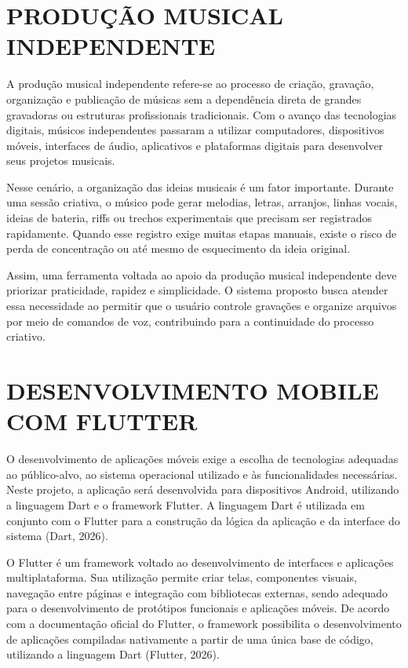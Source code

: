 \documentclass[12pt,oneside,a4paper,brazil,final]{abntex2}
\begin{document}
\section{PRODUÇÃO MUSICAL INDEPENDENTE}



A produção musical independente refere-se ao processo de criação, gravação, organização e publicação de músicas sem a dependência direta de grandes gravadoras ou estruturas profissionais tradicionais. Com o avanço das tecnologias digitais, músicos independentes passaram a utilizar computadores, dispositivos móveis, interfaces de áudio, aplicativos e plataformas digitais para desenvolver seus projetos musicais.



Nesse cenário, a organização das ideias musicais é um fator importante. Durante uma sessão criativa, o músico pode gerar melodias, letras, arranjos, linhas vocais, ideias de bateria, riffs ou trechos experimentais que precisam ser registrados rapidamente. Quando esse registro exige muitas etapas manuais, existe o risco de perda de concentração ou até mesmo de esquecimento da ideia original.



Assim, uma ferramenta voltada ao apoio da produção musical independente deve priorizar praticidade, rapidez e simplicidade. O sistema proposto busca atender essa necessidade ao permitir que o usuário controle gravações e organize arquivos por meio de comandos de voz, contribuindo para a continuidade do processo criativo.



\section{DESENVOLVIMENTO MOBILE COM FLUTTER}



O desenvolvimento de aplicações móveis exige a escolha de tecnologias adequadas ao público-alvo, ao sistema operacional utilizado e às funcionalidades necessárias. Neste projeto, a aplicação será desenvolvida para dispositivos Android, utilizando a linguagem Dart e o framework Flutter. A linguagem Dart é utilizada em conjunto com o Flutter para a construção da lógica da aplicação e da interface do sistema (Dart, 2026).



O Flutter é um framework voltado ao desenvolvimento de interfaces e aplicações multiplataforma. Sua utilização permite criar telas, componentes visuais, navegação entre páginas e integração com bibliotecas externas, sendo adequado para o desenvolvimento de protótipos funcionais e aplicações móveis. De acordo com a documentação oficial do Flutter, o framework possibilita o desenvolvimento de aplicações compiladas nativamente a partir de uma única base de código, utilizando a linguagem Dart (Flutter, 2026).
\end{document}
